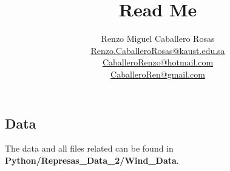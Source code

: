 \documentclass[12pt]{article}
\theoremstyle{definition}
\theoremstyle{remark}
\begin{document}
\title{Read Me}
\author{Renzo Miguel Caballero Rosas\\
\url{Renzo.CaballeroRosas@kaust.edu.sa}\\
\url{CaballeroRenzo@hotmail.com}\\
\url{CaballeroRen@gmail.com}} 
\maketitle

\subsection*{Data}

The data and all files related can be found in \textbf{Python/Represas\_Data\_2/Wind\_Data}.
\end{document}
